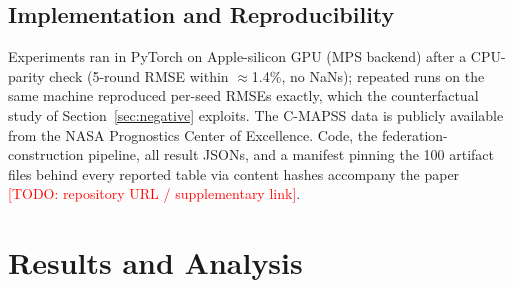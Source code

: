 \documentclass[journal]{IEEEtran}
\newcommand{\todo}[1]{\textcolor{red}{[TODO: #1]}}
\begin{document}
\subsection{Implementation and Reproducibility}
\begin{table}[t]
\caption{Hyperparameters (fixed unless noted)}
\label{tab:hyper}
\centering\small
{}
\end{table}
Experiments ran in PyTorch on Apple-silicon GPU (MPS backend) after a CPU-parity check (5-round RMSE within $\approx$1.4\%, no NaNs); repeated runs on the same machine reproduced per-seed RMSEs exactly, which the counterfactual study of Section~\ref{sec:negative} exploits. The C-MAPSS data is publicly available from the NASA Prognostics Center of Excellence. Code, the federation-construction pipeline, all result JSONs, and a manifest pinning the 100 artifact files behind every reported table via content hashes accompany the paper \todo{repository URL / supplementary link}.

\section{Results and Analysis}\label{sec:results}
\end{document}
